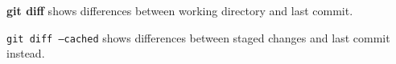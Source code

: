 %

\textbf{git diff} shows differences between working directory and last commit.

\texttt{git diff --cached} shows differences between staged changes and last commit instead.

%